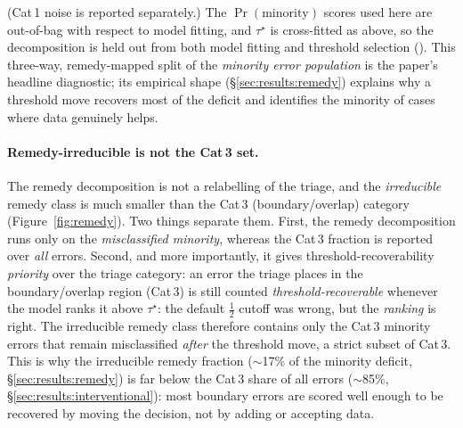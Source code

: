 (Cat\,1 noise is reported separately.) The $\Pr(\text{minority})$ scores used
here are out-of-bag with respect to model fitting, and $\tau^\star$ is
cross-fitted as above, so the decomposition is held out from both model fitting
and threshold selection (). This three-way, remedy-mapped split
of the \emph{minority error population} is the paper's headline diagnostic; its
empirical shape (\S\ref{sec:results:remedy}) explains why a threshold move recovers
most of the deficit and identifies the minority of cases where data genuinely helps.

\paragraph{Remedy-irreducible is not the Cat\,3 set.} The remedy decomposition is
not a relabelling of the triage, and the \emph{irreducible} remedy class is much
smaller than the Cat\,3 (boundary/overlap) category (Figure~\ref{fig:remedy}). Two
things separate them.
First, the remedy decomposition runs only on the \emph{misclassified minority},
whereas the Cat\,3 fraction is reported over \emph{all} errors. Second, and more
importantly, it gives threshold-recoverability \emph{priority} over the triage
category: an error the triage places in the boundary/overlap region (Cat\,3) is
still counted \emph{threshold-recoverable} whenever the model ranks it above
$\tau^\star$: the default $\tfrac12$ cutoff was wrong, but the \emph{ranking} is
right. The irreducible remedy class therefore contains only the Cat\,3 minority
errors that remain misclassified \emph{after} the threshold move, a strict subset
of Cat\,3. This is why the irreducible remedy fraction ($\sim$17\% of the minority
deficit, \S\ref{sec:results:remedy}) is far below the Cat\,3 share of all errors
($\sim$85\%, \S\ref{sec:results:interventional}): most boundary errors are scored
well enough to be recovered by moving the decision, not by adding or accepting data.

